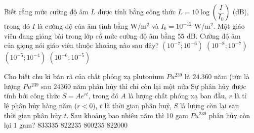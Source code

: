 \begin{ex}%
	Biết rằng mức cường độ âm $L$ được tính bằng công thức $L=10\log\left(\dfrac{I}{I_0}\right)$ (dB), trong đó $I$ là cường độ của âm tính bằng W/m$^2$ và $I_0=10^{-12}$ W/m$^2$. Một giáo viên đang giảng bài trong lớp có mức cường độ âm bằng $55$ dB. Cường độ âm của giọng nói giáo viên  thuộc khoảng nào sau đây?
	 \choice
		 {\True $\left(10^{-7};10^{-6}\right)$}
		{$\left(10^{-8};10^{-7}\right)$} 
		 {$\left(10^{-5};10^{-4}\right)$}
		{$\left(10^{-6};10^{-5}\right)$} 
\end{ex}

\begin{ex}%
	Cho biết chu kì bán rã của chất phỏng xạ plutonium $Pu^{239}$  là $24.360$ năm (tức là lượng $Pu^{239}$ sau $24360$ năm phân hủy thì chỉ còn lại một nửa
	Sự phân hủy được tính bởi công thức $S=Ae^{rt}$, trong đó $A$ là lượng chất phóng xạ ban đầu, $r$ là tỉ lệ phân hủy hàng năm ($r < 0$), $t$ là thời gian phân huỷ, $S$ là lượng còn lại sau thời gian phân hủy $t$. Sau khoảng bao nhiêu năm  thì 10 gam $Pu^{239}$ phân hủy còn lại $1$ gam?
	 \choice
		{$833335$} 
		{\True  $822235$}
		 {$800235$}
		 {$822000$}
\end{ex}

